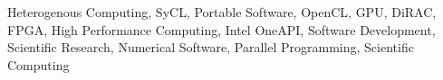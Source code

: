 Heterogenous Computing, SyCL, Portable Software, OpenCL, GPU, DiRAC, FPGA, High Performance Computing, Intel OneAPI, Software Development, Scientific Research, Numerical Software, Parallel Programming, Scientific Computing

